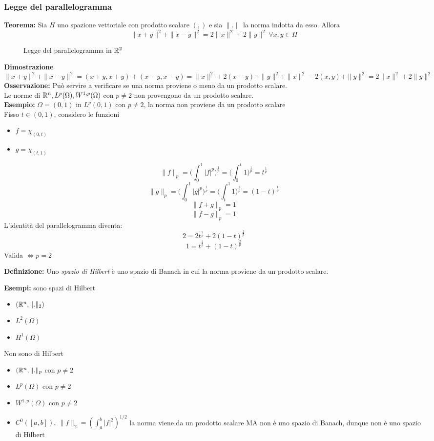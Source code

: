 \subsubsection{Legge del parallelogramma}
\begin{tcolorbox}
	\textbf{Teorema: }Sia $H$ uno spazione vettoriale con prodotto scalare $(,)$ e sia $\|.\|$ la norma indotta da esso. Allora 
	\[\|x+y\|^2+\|x-y\|^2=2\|x\|^2+2\|y\|^2\ \forall x,y\in H\]

\end{tcolorbox}
\begin{figure}[ht]
    \centering
    \caption{Legge del parallelogramma in $\mathbb{R}^2$}
    \label{fig:parallelogramma}
\end{figure}
\textbf{Dimostrazione}
\[\|x+y\|^2+\|x-y\|^2=(x+y,x+y)+(x-y,x-y)=\|x\|^2+2(x-y)+\|y\|^2+\|x\|^2-2(x,y)+\|y\|^2=2\|x\|^2+2\|y\|^2\]
\textbf{Osservazione: }Può servire a verificare se una norma proviene o meno da un prodotto scalare.
\\Le norme di $\mathbb{R}^n,L^{p}(\Omega), W^{1,p}(\Omega)$ con $p\neq 2$ non provengono da un prodotto scalare.
\\\textbf{Esempio: }$\Omega=(0,1)$ in $L^{p}(0,1)$ con  $p\neq 2$, la norma non proviene da un prodotto scalare
\\Fisso $t\in (0,1)$, considero le funzioni
 \begin{itemize}
	 \item $f=\chi_{(0,t)}$ 
	 \item $g=\chi_{(t,1)} $
\end{itemize}
\[\|f\|_p=\bigg(\int_{0}^{1} |f|^p\bigg)^{\frac{1}{p}}=\bigg(\int_{0}^{t} 1\bigg)^{\frac{1}{p}}=t ^{\frac{1}{p}}\]
\[\|g\|_p=\bigg(\int_{0}^{1} |g|^p\bigg)^{\frac{1}{p}}=\bigg(\int_{t}^{1} 1\bigg)^{\frac{1}{p}}=(1-t) ^{\frac{1}{p}}\]
\[\|f+g\|_p=1\]
\[\|f-g\|_p=1\]
L'identità del parallelogramma diventa:
\[2=2t ^{\frac{2}{p}}+2(1-t)^{\frac{2}{p}}\]
\[1=t ^{\frac{2}{p}}+(1-t)^{\frac{2}{p}}\]
Valida $\iff p=2$
\begin{tcolorbox}
	\textbf{Definizione: }Uno \emph{spazio di Hilbert} è uno spazio di Banach in cui la norma proviene da un prodotto scalare.  \end{tcolorbox} \textbf{Esempi:} sono spazi di Hilbert
\begin{itemize}
	\item $(\mathbb{R}^n,\|.\|_2)$ 
	\item $L^{2}(\Omega)$ 
	\item $H^1(\Omega)$
\end{itemize}
Non sono di Hilbert
\begin{itemize}
	\item $(\mathbb{R}^n,\|.\|_p$ con $p\neq 2$ 
	\item $L^{p}(\Omega)$ con $p\neq 2$ 
	\item $W^{1,p}(\Omega)$ con $p\neq 2$ 
	\item $C^0([a,b]),\ \|f\|_2=(\int_{a}^{b} |f|^2)^{1 / 2} $ la norma viene da un prodotto scalare MA non è uno spazio di Banach, dunque non è uno spazio di Hilbert
\end{itemize}

